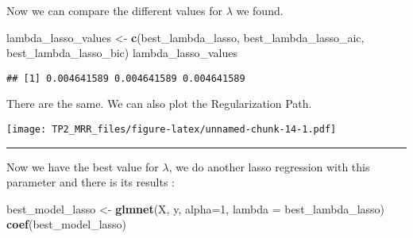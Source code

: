 \documentclass[
]{article}
\newenvironment{Shaded}{\begin{snugshade}}{\end{snugshade}}
\newcommand{\AttributeTok}[1]{\textcolor[rgb]{0.13,0.29,0.53}{#1}}
\newcommand{\DecValTok}[1]{\textcolor[rgb]{0.00,0.00,0.81}{#1}}
\newcommand{\FunctionTok}[1]{\textcolor[rgb]{0.13,0.29,0.53}{\textbf{#1}}}
\newcommand{\NormalTok}[1]{#1}
\newcommand{\OtherTok}[1]{\textcolor[rgb]{0.56,0.35,0.01}{#1}}
\newcommand{\SpecialCharTok}[1]{\textcolor[rgb]{0.81,0.36,0.00}{\textbf{#1}}}
\newcommand{\StringTok}[1]{\textcolor[rgb]{0.31,0.60,0.02}{#1}}
\begin{document}
Now we can compare the different values for \(\lambda\) we found.

\begin{Shaded}
\begin{Highlighting}[]
\NormalTok{lambda\_lasso\_values }\OtherTok{\textless{}{-}} \FunctionTok{c}\NormalTok{(best\_lambda\_lasso, best\_lambda\_lasso\_aic, best\_lambda\_lasso\_bic)}
\NormalTok{lambda\_lasso\_values}
\end{Highlighting}
\end{Shaded}

\begin{verbatim}
## [1] 0.004641589 0.004641589 0.004641589
\end{verbatim}

There are the same. We can also plot the Regularization Path.

\begin{Shaded}
\end{Shaded}

\texttt{[image: TP2\_MRR\_files/figure-latex/unnamed-chunk-14-1.pdf]}

\begin{center}\rule{0.5\linewidth}{0.5pt}\end{center}

Now we have the best value for \(\lambda\), we do another lasso
regression with this parameter and there is its results :

\begin{Shaded}
\begin{Highlighting}[]
\NormalTok{best\_model\_lasso }\OtherTok{\textless{}{-}} \FunctionTok{glmnet}\NormalTok{(X, y, }\AttributeTok{alpha=}\DecValTok{1}\NormalTok{, }\AttributeTok{lambda =}\NormalTok{ best\_lambda\_lasso)}
\FunctionTok{coef}\NormalTok{(best\_model\_lasso)}
\end{Highlighting}
\end{Shaded}
\end{document}
